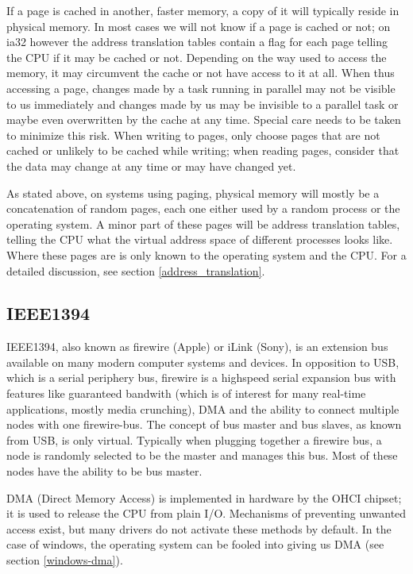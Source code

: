 If a page is cached in another, faster memory, a copy of it will typically
reside in physical memory. In most cases we will not know if a page is cached
or not; on ia32 however the address translation tables contain a flag for each
page telling the CPU if it may be cached or not. Depending on the way used to
access the memory, it may circumvent the cache or not have access to it at all.
When thus accessing a page, changes made by a task running in parallel may not
be visible to us immediately and changes made by us may be invisible to a
parallel task or maybe even overwritten by the cache at any time. Special care
needs to be taken to minimize this risk. When writing to pages, only choose
pages that are not cached or unlikely to be cached while writing; when reading
pages, consider that the data may change at any time or may have changed yet.

As stated above, on systems using paging, physical memory will mostly be a
concatenation of random pages, each one either used by a random process or the
operating system. A minor part of these pages will be address translation
tables, telling the CPU what the virtual address space of different processes
looks like. Where these pages are is only known to the operating system and the
CPU.  For a detailed discussion, see section \ref{address_translation}.



\subsection{IEEE1394}

IEEE1394, also known as firewire (Apple) or iLink (Sony), is an extension bus
available on many modern computer systems and devices.  In opposition to USB,
which is a serial periphery bus, firewire is a highspeed serial expansion bus
with features like guaranteed bandwith (which is of interest for many real-time
applications, mostly media crunching), DMA and the ability to connect multiple
nodes with one firewire-bus. The concept of bus master and bus slaves, as known
from USB, is only virtual. Typically when plugging together a firewire bus, a
node is randomly selected to be the master and manages this bus. Most of these
nodes have the ability to be bus master.

DMA (Direct Memory Access) is implemented in hardware by the OHCI chipset; it
is used to release the CPU from plain I/O. Mechanisms of preventing unwanted
access exist, but many drivers do not activate these methods by default. In the
case of windows, the operating system can be fooled into giving us DMA (see
section \ref{windows-dma}).

